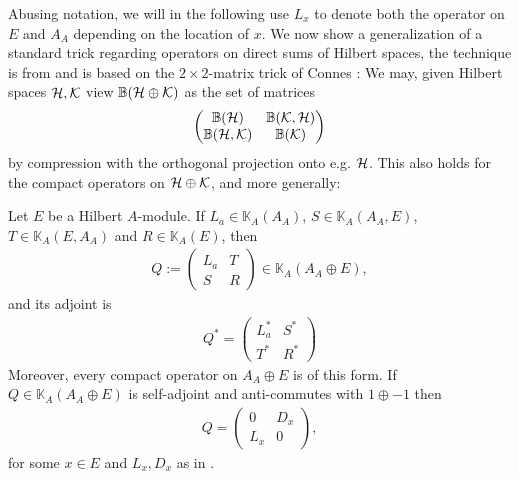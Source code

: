 Abusing notation, we will in the following use $L_x$ to denote both the operator on $E$ and $A_A$ depending on the location of $x$. We now show a generalization of a standard trick regarding operators on direct sums of Hilbert spaces, the technique is from \cite{blanchard1996deformations} and is based on the $2\times 2$-matrix trick of Connes \cite{connesclassification}: We may, given Hilbert spaces $\mathcal{H}, \mathcal{K}$ view $\mathbb{B}(\mathcal{H} \oplus \mathcal{K})$ as the set of matrices
\begin{align*}
	\begin{pmatrix}
		\mathbb{B}(\mathcal{H}) & \mathbb{B}(\mathcal{K},\mathcal{H})\\
		\mathbb{B}(\mathcal{H},\mathcal{K}) &   \mathbb{B}(\mathcal{K})
	\end{pmatrix}
\end{align*}
by compression with the orthogonal projection onto e.g. $\mathcal{H}$. This also holds for the compact operators on $\mathcal{H} \oplus \mathcal{K}$, and more generally:
\begin{lemma}
	Let $E$ be a Hilbert $A$-module. If $L_a \in \mathbb{K}_A(A_A)$, $S \in \mathbb{K}_A(A_A,E)$, $T \in \mathbb{K}_A(E,A_A)$ and $R \in \mathbb{K}_A(E)$, then
	\begin{align*}
		Q := \begin{pmatrix}
			L_a & T \\
			S & R
		\end{pmatrix}\in \mathbb{K}_A(A_A \oplus E),
	\end{align*}
	and its adjoint is
	\begin{align*}
		Q^* = \begin{pmatrix}
			L_a^* & S^* \\
			T^* & R^*
		\end{pmatrix}
	\end{align*}
	Moreover, every compact operator on $A_A \oplus E$ is of this form. If $Q \in \mathbb{K}_A(A_A \oplus E)$ is self-adjoint and anti-commutes with $1 \oplus -1$ then
	\begin{align*}
		Q = \begin{pmatrix}
			0 & D_x \\
			L_x  & 0
		\end{pmatrix},
	\end{align*}
	for some $x \in E$ and $L_x, D_x$ as in .
	\label{mult:2x2trick}
\end{lemma}
